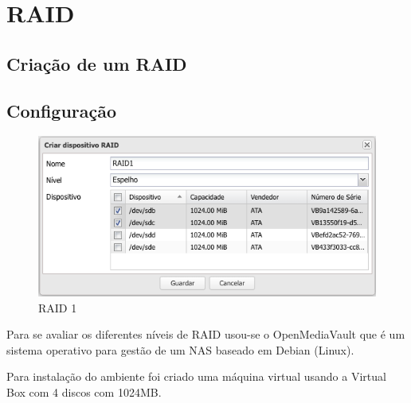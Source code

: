 \documentclass[pdftex,12pt,a4paper]{report}
\begin{document}
\renewcommand{\headrulewidth}{0pt}

\fancyhead{}
\fancyfoot{}
\rfoot{\thepage}

\renewcommand*\contentsname{Conteúdos}
\renewcommand*\figurename{Figura}
\renewcommand*\tablename{Tabela}

\tableofcontents
\renewcommand{\headrulewidth}{0.15pt}
\renewcommand{\thechapter}{}

\clearpage

\section{RAID}

\subsection{Criação de um RAID}

\subsection{Configuração}

\begin{figure}[!htb]
\center
 \includegraphics[width=150mm,scale=1]{imagens/RAID1Create.png}
 \caption{RAID 1}
 \label{fig:exemploraid}
\end{figure}

Para se avaliar os diferentes níveis de RAID usou-se o OpenMediaVault que é um sistema operativo para gestão de um NAS baseado em Debian (Linux).

Para instalação do ambiente foi criado uma máquina virtual usando a Virtual Box com 4 discos com 1024MB.
\end{document}
